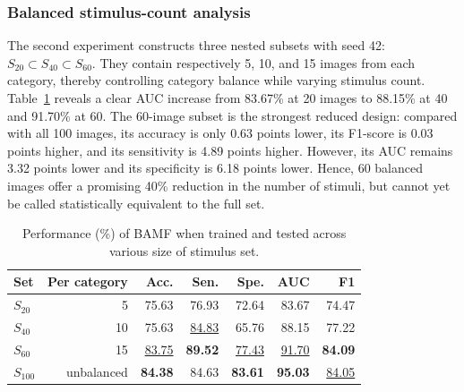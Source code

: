 \documentclass[conference,a4paper]{IEEEtran}
\begin{document}
\subsubsection{Balanced stimulus-count analysis}
The second experiment constructs three nested subsets with seed 42: $S_{20}\subset S_{40}\subset S_{60}$. They contain respectively 5, 10, and 15 images from each category, thereby controlling category balance while varying stimulus count. Table~\ref{tab:stimulus_count} reveals a clear AUC increase from 83.67\% at 20 images to 88.15\% at 40 and 91.70\% at 60. The 60-image subset is the strongest reduced design: compared with all 100 images, its accuracy is only 0.63 points lower, its F1-score is 0.03 points higher, and its sensitivity is 4.89 points higher. However, its AUC remains 3.32 points lower and its specificity is 6.18 points lower. Hence, 60 balanced images offer a promising 40\% reduction in the number of stimuli, but cannot yet be called statistically equivalent to the full set.


\begin{table}[t]
\caption{Performance (\%) of BAMF when trained and tested across various size of stimulus set.}
\label{tab:stimulus_count}
\centering
\small
\setlength{\tabcolsep}{5.2pt}
\begin{tabular}{lrrrrrr}
\toprule
Set & Per category & Acc. & Sen. & Spe. & AUC & F1 \\
\midrule
$S_{20}$ & 5 & 75.63 & 76.93 & 72.64 & 83.67 & 74.47 \\
$S_{40}$ & 10 & 75.63 & \underline{84.83} & 65.76 & 88.15 & 77.22 \\
$S_{60}$ & 15 & \underline{83.75} & \textbf{89.52} & \underline{77.43} & \underline{91.70} & \textbf{84.09} \\
$S_{100}$ & unbalanced & \textbf{84.38} & 84.63 & \textbf{83.61} & \textbf{95.03} & \underline{84.05} \\
\bottomrule
\end{tabular}
\end{table}
\end{document}
